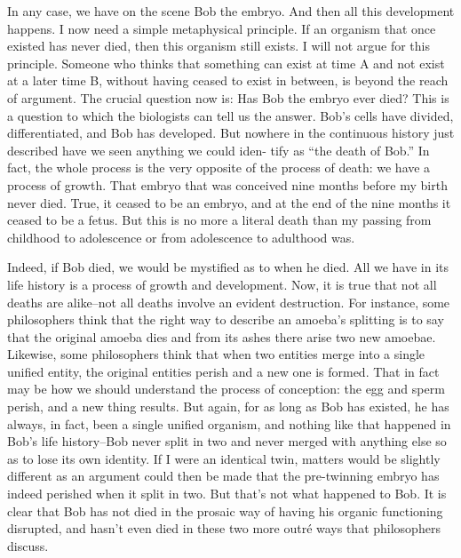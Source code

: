 In any case, we have on the scene Bob the embryo.  And then all 
this development happens.  I now need a simple metaphysical principle.  
If an organism that once existed has never died, then this organism still 
exists.    I  will  not  argue  for  this  principle.    Someone  who  thinks  that 
something  can  exist  at  time  A  and  not  exist  at  a  later  time  B,  without 
having ceased to exist in between, is beyond the reach of argument.  The 
crucial  question  now  is:  Has  Bob  the  embryo  ever  died?    This  is  a 
question to which the biologists can tell us the answer.  Bob’s cells have 
divided,  differentiated,  and  Bob  has  developed.    But  nowhere  in  the 
continuous history just described have we seen anything we could iden-
tify as “the death of Bob.”  In fact, the whole process is the very opposite 
of the process of death: we have a process of growth.  That embryo that 
was conceived nine months before my birth never died.  True, it ceased 
to be an embryo, and at the end of the nine months it ceased to be a fetus. 
 But this is no more a literal death than my passing from childhood to 
adolescence or from adolescence to adulthood was. 

Indeed, if Bob died, we would be mystified as to when he died.  All 
we have in its life history is a process of growth and development.  Now, 
it is true that not all deaths are alike–not all deaths involve an evident 
destruction.  For instance, some philosophers think that the right way to 
describe an amoeba’s splitting is to say that the original amoeba dies and 
from its ashes there arise two new amoebae.  Likewise, some 
philosophers  think  that  when  two  entities  merge  into  a  single  unified 
entity, the original entities perish and a new one is formed.  That in fact 
may be how we should understand the process of conception: the egg and 
sperm perish, and a new thing results.  But again, for as long as Bob has 
existed,  he  has  always,  in  fact,  been  a  single  unified  organism,  and 
nothing like that happened in Bob’s life history–Bob never split in two 
and never merged with anything else so as to lose its own identity.  If I 
were an identical twin, matters would be slightly different as an argument 
could then be made that the pre-twinning embryo has indeed perished 
when it split in two.  But that’s not what happened to Bob.  It is clear that 
Bob has not died in the prosaic way of having his organic functioning 
disrupted,  and  hasn’t  even  died  in  these  two  more  outré  ways  that 
philosophers discuss.  

